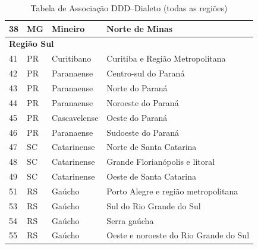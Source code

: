 \begin{table}[ht]
\begin{tabular}{llll}
    38 & MG & Mineiro               & Norte de Minas                          \\
    \midrule
    \multicolumn{4}{l}{\textbf{Região Sul}} \\ 
    41 & PR & Curitibano        & Curitiba e Região Metropolitana     \\
    42 & PR & Paranaense        & Centro-sul do Paraná                \\
    43 & PR & Paranaense        & Norte do Paraná                     \\
    44 & PR & Paranaense        & Noroeste do Paraná                  \\
    45 & PR & Cascavelense      & Oeste do Paraná                     \\
    46 & PR & Paranaense        & Sudoeste do Paraná                  \\
    47 & SC & Catarinense       & Norte de Santa Catarina             \\
    48 & SC & Catarinense       & Grande Florianópolis e litoral      \\
    49 & SC & Catarinense       & Oeste de Santa Catarina             \\
    51 & RS & Gaúcho            & Porto Alegre e região metropolitana \\
    53 & RS & Gaúcho            & Sul do Rio Grande do Sul            \\
    54 & RS & Gaúcho            & Serra gaúcha                        \\
    55 & RS & Gaúcho            & Oeste e noroeste do Rio Grande do Sul \\
    \bottomrule
  \end{tabular}
  \caption{Tabela de Associação DDD–Dialeto (todas as regiões)}
  \label{tab:ddd-dialeto-todas}
\end{table}

